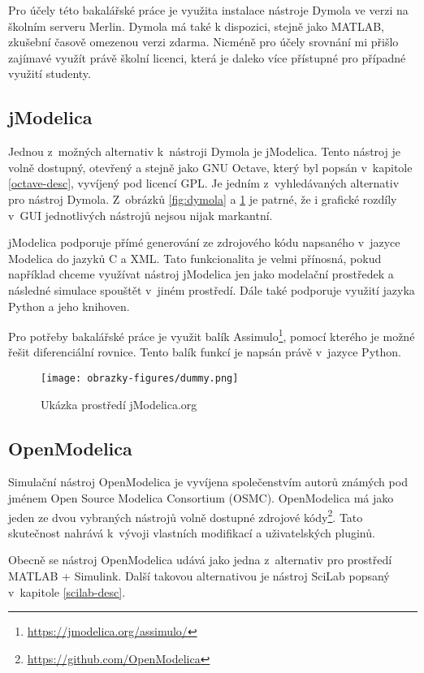 Pro účely této bakalářské práce je využita instalace nástroje Dymola ve verzi  na školním serveru Merlin. Dymola má také k dispozici, stejně jako MATLAB, zkušební časově omezenou verzi zdarma. Nicméně pro účely srovnání mi přišlo zajímavé využít právě školní licenci, která je daleko více přístupné pro případné využití studenty.


\subsection{jModelica}
Jednou z~možných alternativ k~nástroji Dymola je jModelica. Tento nástroj je volně dostupný, otevřený a stejně jako GNU Octave, který byl popsán v~kapitole \ref{octave-desc}, vyvíjený pod licencí GPL. Je jedním z~vyhledávaných alternativ pro nástroj Dymola. Z~obrázků \ref{fig:dymola} a \ref{fig:jmodelica} je patrné, že i grafické rozdíly v~GUI jednotlivých nástrojů nejsou nijak markantní.

jModelica podporuje přímé generování ze zdrojového kódu napsaného v~jazyce Modelica do jazyků C a XML. Tato funkcionalita je velmi přínosná, pokud například chceme využívat nástroj jModelica jen jako modelační prostředek a následné simulace spouštět v~jiném prostředí. Dále také podporuje využití jazyka Python a jeho knihoven.

Pro potřeby bakalářské práce je využit balík Assimulo\footnote{\url{https://jmodelica.org/assimulo/}}, pomocí kterého je možné řešit diferenciální rovnice. Tento balík funkcí je napsán právě v~jazyce Python.

\begin{figure}
    \centering
    \texttt{[image: obrazky-figures/dummy.png]}
    \caption{Ukázka prostředí jModelica.org}
    \label{fig:jmodelica}
\end{figure}


\subsection{OpenModelica}
\label{openmodelica-desc}
Simulační nástroj OpenModelica je vyvíjena společenstvím autorů známých pod jménem Open Source Modelica Consortium (OSMC). OpenModelica má jako jeden ze dvou vybraných nástrojů volně dostupné zdrojové kódy\footnote{\url{https://github.com/OpenModelica}}. Tato skutečnost nahrává k~vývoji vlastních modifikací a uživatelských pluginů.

Obecně se nástroj OpenModelica udává jako jedna z~alternativ pro prostředí MATLAB + Simulink. Další takovou alternativou je nástroj SciLab popsaný v~kapitole \ref{scilab-desc}.

